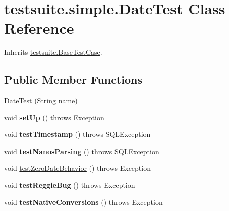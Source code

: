 \hypertarget{classtestsuite_1_1simple_1_1_date_test}{}\section{testsuite.\+simple.\+Date\+Test Class Reference}
\label{classtestsuite_1_1simple_1_1_date_test}


Inherits \mbox{\hyperlink{classtestsuite_1_1_base_test_case}{testsuite.\+Base\+Test\+Case}}.

\subsection*{Public Member Functions}
\begin{DoxyCompactItemize}
\item 
\mbox{\hyperlink{classtestsuite_1_1simple_1_1_date_test_a60a505c566e773c02bbbb3110db9f086}{Date\+Test}} (String name)
\item 
\mbox{\label{classtestsuite_1_1simple_1_1_date_test_a647fe9ec63530089f263b6e3b11c9416}} 
void {\bfseries set\+Up} ()  throws Exception 
\item 
\mbox{\label{classtestsuite_1_1simple_1_1_date_test_ad5650d68e2ad8f8299ee50582df96fbd}} 
void {\bfseries test\+Timestamp} ()  throws S\+Q\+L\+Exception 
\item 
\mbox{\label{classtestsuite_1_1simple_1_1_date_test_a8ff33660e5f3bef72c6e40dafff29179}} 
void {\bfseries test\+Nanos\+Parsing} ()  throws S\+Q\+L\+Exception 
\item 
void \mbox{\hyperlink{classtestsuite_1_1simple_1_1_date_test_a65e40a7db246ac9e6d412004a72e4bd4}{test\+Zero\+Date\+Behavior}} ()  throws Exception 
\item 
\mbox{\label{classtestsuite_1_1simple_1_1_date_test_a68b7b47868eba16b30f704412bff26a2}} 
void {\bfseries test\+Reggie\+Bug} ()  throws Exception 
\item 
\mbox{\label{classtestsuite_1_1simple_1_1_date_test_a77231bba7d456a9a577452a353b9348e}} 
void {\bfseries test\+Native\+Conversions} ()  throws Exception 
\end{DoxyCompactItemize}
